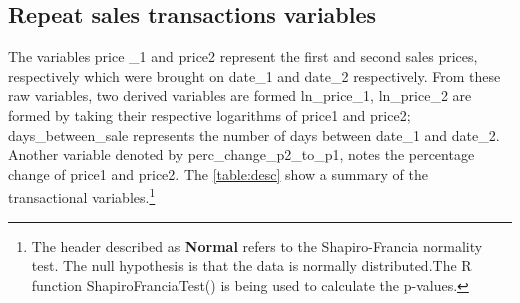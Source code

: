 \documentclass[12pt]{article}
\begin{document}
\subsection{Repeat sales transactions variables}
The variables price \_1 and \gls{price2} represent the first and second sales prices, respectively which were brought on date\_1 and date\_2 respectively. From these raw variables, two derived variables are formed ln\_price\_1, ln\_price\_2 are formed by taking their respective logarithms of \gls{price1} and \gls{price2}; days\_between\_sale represents the number of days between date\_1 and date\_2. Another variable denoted by perc\_change\_p2\_to\_p1, notes the percentage change of \gls{price1} and \gls{price2}.
The \autoref{table:desc} show a summary of the transactional variables.\footnote{The header described as \textbf{Normal} refers to the Shapiro-Francia normality test. The null hypothesis is that the data is normally distributed.The R function ShapiroFranciaTest() is being used to calculate the p-values.}
\begin{table}[H]
\caption{Descriptive statistics of the transactional variables}
\label{table:desc}
\end{table}
\end{document}
